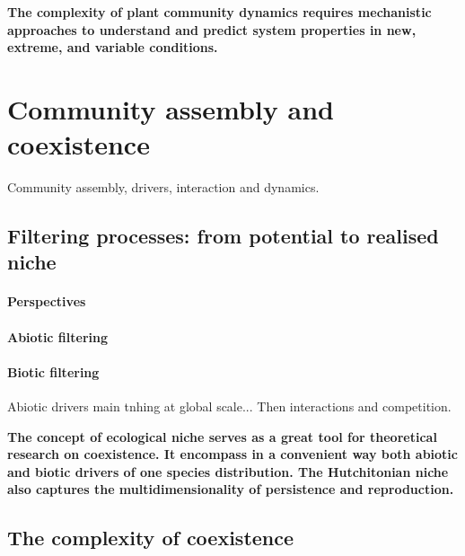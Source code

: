 \textbf{The complexity of plant community dynamics requires mechanistic approaches to understand and predict system properties in new, extreme, and variable conditions. }

\section{Community assembly and coexistence}

Community assembly, drivers, interaction and dynamics.


\subsection{Filtering processes: from potential to realised niche}

\paragraph{Perspectives}

\paragraph{Abiotic filtering}

\paragraph{Biotic filtering}

Abiotic drivers main tnhing at global scale... Then interactions and competition.

\textbf{The concept of ecological niche serves as a great tool for theoretical research on coexistence. It encompass in a convenient way both abiotic and biotic drivers of one species distribution. The Hutchitonian niche also captures the multidimensionality of persistence and reproduction.}


\subsection{The complexity of coexistence}

